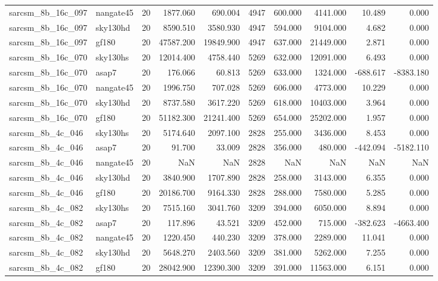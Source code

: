 \documentclass{article}
\begin{document}
\begin{longtable}{llrrrrrrrr}
sarcsm\_8b\_16c\_097 & nangate45 & 20 & 1877.060 & 690.004 & 4947 & 600.000 & 4141.000 & 10.489 & 0.000 \\
sarcsm\_8b\_16c\_097 & sky130hd & 20 & 8590.510 & 3580.930 & 4947 & 594.000 & 9104.000 & 4.682 & 0.000 \\
sarcsm\_8b\_16c\_097 & gf180 & 20 & 47587.200 & 19849.900 & 4947 & 637.000 & 21449.000 & 2.871 & 0.000 \\
sarcsm\_8b\_16c\_070 & sky130hs & 20 & 12014.400 & 4758.440 & 5269 & 632.000 & 12091.000 & 6.493 & 0.000 \\
sarcsm\_8b\_16c\_070 & asap7 & 20 & 176.066 & 60.813 & 5269 & 633.000 & 1324.000 & -688.617 & -8383.180 \\
sarcsm\_8b\_16c\_070 & nangate45 & 20 & 1996.750 & 707.028 & 5269 & 606.000 & 4773.000 & 10.229 & 0.000 \\
sarcsm\_8b\_16c\_070 & sky130hd & 20 & 8737.580 & 3617.220 & 5269 & 618.000 & 10403.000 & 3.964 & 0.000 \\
sarcsm\_8b\_16c\_070 & gf180 & 20 & 51182.300 & 21241.400 & 5269 & 654.000 & 25202.000 & 1.957 & 0.000 \\
sarcsm\_8b\_4c\_046 & sky130hs & 20 & 5174.640 & 2097.100 & 2828 & 255.000 & 3436.000 & 8.453 & 0.000 \\
sarcsm\_8b\_4c\_046 & asap7 & 20 & 91.700 & 33.009 & 2828 & 356.000 & 480.000 & -442.094 & -5182.110 \\
sarcsm\_8b\_4c\_046 & nangate45 & 20 & NaN & NaN & 2828 & NaN & NaN & NaN & NaN \\
sarcsm\_8b\_4c\_046 & sky130hd & 20 & 3840.900 & 1707.890 & 2828 & 258.000 & 3143.000 & 6.355 & 0.000 \\
sarcsm\_8b\_4c\_046 & gf180 & 20 & 20186.700 & 9164.330 & 2828 & 288.000 & 7580.000 & 5.285 & 0.000 \\
sarcsm\_8b\_4c\_082 & sky130hs & 20 & 7515.160 & 3041.760 & 3209 & 394.000 & 6050.000 & 8.894 & 0.000 \\
sarcsm\_8b\_4c\_082 & asap7 & 20 & 117.896 & 43.521 & 3209 & 452.000 & 715.000 & -382.623 & -4663.400 \\
sarcsm\_8b\_4c\_082 & nangate45 & 20 & 1220.450 & 440.230 & 3209 & 378.000 & 2289.000 & 11.041 & 0.000 \\
sarcsm\_8b\_4c\_082 & sky130hd & 20 & 5648.270 & 2403.560 & 3209 & 381.000 & 5262.000 & 7.255 & 0.000 \\
sarcsm\_8b\_4c\_082 & gf180 & 20 & 28042.900 & 12390.300 & 3209 & 391.000 & 11563.000 & 6.151 & 0.000 \\

\end{longtable}
\end{document}
